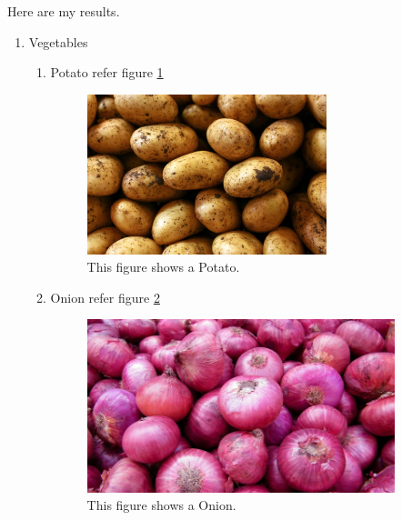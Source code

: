 \documentclass[a4paper,12pt]{report}
\begin{document}
	Here are my results.
   \begin{enumerate}
   	\item {Vegetables}
   	\begin{enumerate}
   		\item {Potato refer figure}
   		\ref{Cross-refernce_key}
   		\begin{figure}[p]
  			\centering
   					\includegraphics[width=0.7\textwidth]{index1.jpg}
   			
   			\caption{This figure shows a Potato.}
   			\label{Cross-refernce_key}
   		\end{figure}
   		\item {Onion refer figure}
   		\ref{Cross-refernce_key1}
   		\begin{figure}[p]
   			\includegraphics[width=0.9\textwidth]{index2.jpg}
   			\caption{This figure shows a Onion.}
   			\label{Cross-refernce_key1}
   		\end{figure}
   	
   	\end{enumerate} 
   \end{enumerate}
\end{document}
